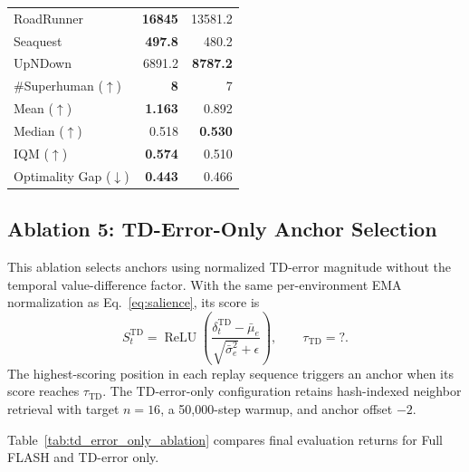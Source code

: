 \documentclass{article} %
\begin{document}
\begin{table}[!htbp]
\begin{tabular}{lrr}
RoadRunner & \textbf{16845} & 13581.2 \\
Seaquest & \textbf{497.8} & 480.2 \\
UpNDown & 6891.2 & \textbf{8787.2} \\
\midrule
\#Superhuman ($\uparrow$) & \textbf{8} & 7 \\
Mean ($\uparrow$) & \textbf{1.163} & 0.892 \\
Median ($\uparrow$) & 0.518 & \textbf{0.530} \\
IQM ($\uparrow$) & \textbf{0.574} & 0.510 \\
Optimality Gap ($\downarrow$) & \textbf{0.443} & 0.466 \\
\bottomrule
\end{tabular}
\end{table}
\FloatBarrier


\clearpage
\subsection{Ablation 5: TD-Error-Only Anchor Selection}
\label{subsec:td_error_only_ablation}

This ablation selects anchors using normalized TD-error magnitude without the temporal value-difference factor. With the same per-environment EMA normalization as Eq.~\eqref{eq:salience}, its score is
\begin{equation}
S_t^{\mathrm{TD}}=\operatorname{ReLU}\!\left(\frac{\delta_t^{\mathrm{TD}}-\bar{\mu}_e}{\sqrt{\bar{\sigma}_e^2}+\epsilon}\right),\qquad \tau_{\mathrm{TD}}=?.
\label{eq:appendix_td_error_only_salience}
\end{equation}
The highest-scoring position in each replay sequence triggers an anchor when its score reaches $\tau_{\mathrm{TD}}$. The TD-error-only configuration retains hash-indexed neighbor retrieval with target $n=16$, a 50,000-step warmup, and anchor offset $-2$.

Table~\ref{tab:td_error_only_ablation} compares final evaluation returns for Full FLASH and TD-error only.
\end{document}
